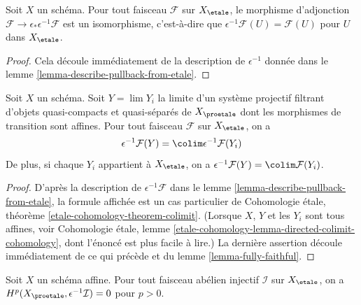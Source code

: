 \begin{lemma}
\label{lemma-fully-faithful}
Soit $X$ un schéma. Pour tout faisceau $\mathcal{F}$ sur $X_\etale$,
le morphisme d'adjonction $\mathcal{F} \to \epsilon_*\epsilon^{-1}\mathcal{F}$ est un
isomorphisme, c'est-à-dire que $\epsilon^{-1}\mathcal{F}(U) = \mathcal{F}(U)$
pour $U$ dans $X_\etale$.
\end{lemma}

\begin{proof}
Cela découle immédiatement de la description de
$\epsilon^{-1}$ donnée dans le lemme \ref{lemma-describe-pullback-from-etale}.
\end{proof}

\begin{lemma}
\label{lemma-limit-pullback}
Soit $X$ un schéma. Soit $Y = \lim Y_i$ la limite d'un système projectif filtrant
d'objets quasi-compacts et quasi-séparés de $X_\proetale$
dont les morphismes de transition sont affines. Pour tout faisceau $\mathcal{F}$ sur $X_\etale$,
on a
$$
\epsilon^{-1}\mathcal{F}(Y) = \colim \epsilon^{-1}\mathcal{F}(Y_i)
$$
De plus, si chaque $Y_i$ appartient à $X_\etale$, on a
$\epsilon^{-1}\mathcal{F}(Y) = \colim \mathcal{F}(Y_i)$.
\end{lemma}

\begin{proof}
D'après la description de $\epsilon^{-1}\mathcal{F}$ dans le
lemme \ref{lemma-describe-pullback-from-etale}, la formule affichée
est un cas particulier de Cohomologie \'etale, théorème
\ref{etale-cohomology-theorem-colimit}.
(Lorsque $X$, $Y$ et les $Y_i$ sont tous affines, voir
Cohomologie \'etale, lemme
\ref{etale-cohomology-lemma-directed-colimit-cohomology}, dont l'énoncé est plus facile à lire.)
La dernière assertion découle immédiatement de ce qui précède
et du lemme \ref{lemma-fully-faithful}.
\end{proof}

\begin{lemma}
\label{lemma-affine-vanishing}
Soit $X$ un schéma affine. Pour tout faisceau abélien injectif $\mathcal{I}$ sur
$X_\etale$, on a $H^p(X_\proetale, \epsilon^{-1}\mathcal{I}) = 0$
pour $p > 0$.
\end{lemma}

